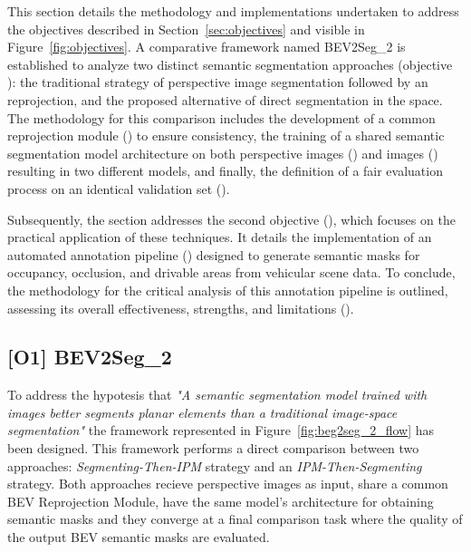 
This section details the methodology and implementations undertaken to address the objectives described in Section~\ref{sec:objectives} and visible in Figure~\ref{fig:objectives}. A comparative framework named BEV2Seg\_2 is established to analyze two distinct  semantic segmentation approaches (objective ): the traditional strategy of perspective image segmentation followed by an  reprojection, and the proposed alternative of direct segmentation in the  space. The methodology for this comparison includes the development of a common  reprojection module () to ensure consistency, the training of a shared semantic segmentation model architecture on both perspective images () and  images () resulting in two different models, and finally, the definition of a fair evaluation process on an identical validation set ().

Subsequently, the section addresses the second objective (), which focuses on the practical application of these techniques. It details the implementation of an automated annotation pipeline () designed to generate  semantic masks for occupancy, occlusion, and drivable areas from vehicular scene data. To conclude, the methodology for the critical analysis of this annotation pipeline is outlined, assessing its overall effectiveness, strengths, and limitations ().


\subsection{[O1] BEV2Seg\_2} \label{sec:bev2seg_2}
To address the hypotesis that \textit{"A semantic segmentation model trained with  images better segments planar elements than a traditional image-space segmentation"} the framework represented in Figure~\ref{fig:beg2seg_2_flow} has been designed. This framework performs a direct comparison between two approaches: \textit{Segmenting-Then-IPM} strategy and an \textit{IPM-Then-Segmenting} strategy. Both approaches recieve perspective images as input, share a common BEV Reprojection Module, have the same model's architecture for obtaining semantic masks and they converge at a final comparison task where the quality of the output BEV semantic masks are evaluated.

